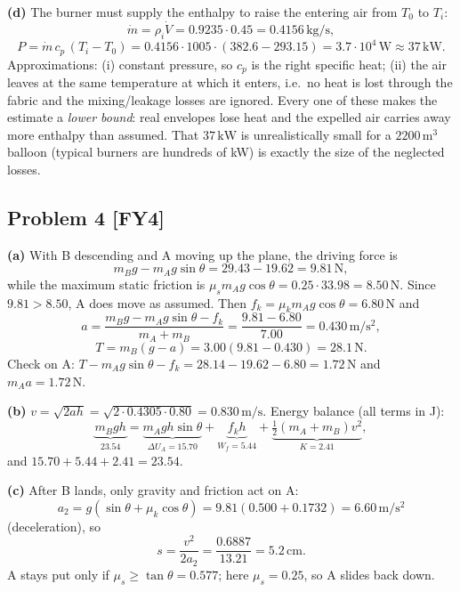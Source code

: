 \documentclass[11pt,a4paper]{article}
\newcommand{\problem}[2]{\subsection*{Problem #1 \; \textnormal{\small[#2]}}}
\newcommand{\unit}[1]{\,\mathrm{#1}}
\begin{document}
\textbf{(d)} The burner must supply the enthalpy to raise the entering air
from $T_0$ to $T_i$:
\[
  \dot m=\rho_i\dot V=0.9235\cdot0.45=0.4156\unit{kg/s},
\]
\[
  P=\dot m\,c_p\,(T_i-T_0)=0.4156\cdot1005\cdot(382.6-293.15)
  =\boxed{3.7\cdot10^{4}\unit{W}\approx37\unit{kW}}.
\]
Approximations: (i) constant pressure, so $c_p$ is the right specific
heat; (ii) the air leaves at the same temperature at which it enters, i.e.\
no heat is lost through the fabric and the mixing/leakage losses are
ignored. Every one of these makes the estimate a \emph{lower bound}: real
envelopes lose heat and the expelled air carries away more enthalpy than
assumed. That $37\unit{kW}$ is unrealistically small for a
$2200\unit{m^3}$ balloon (typical burners are hundreds of kW) is exactly
the size of the neglected losses.

\problem{4}{FY4}
\textbf{(a)} With B descending and A moving up the plane, the driving force
is
\[
  m_Bg-m_Ag\sin\theta = 29.43-19.62=9.81\unit{N},
\]
while the maximum static friction is
$\mu_s m_Ag\cos\theta=0.25\cdot33.98=8.50\unit{N}$. Since $9.81>8.50$, A
does move as assumed. Then $f_k=\mu_k m_Ag\cos\theta=6.80\unit{N}$ and
\[
  a=\frac{m_Bg-m_Ag\sin\theta-f_k}{m_A+m_B}
  =\frac{9.81-6.80}{7.00}=\boxed{0.430\unit{m/s^2}},
\]
\[
  T=m_B(g-a)=3.00(9.81-0.430)=\boxed{28.1\unit{N}}.
\]
Check on A: $T-m_Ag\sin\theta-f_k=28.14-19.62-6.80=1.72\unit{N}$ and
$m_Aa=1.72\unit{N}$. \checkmark

\textbf{(b)} $v=\sqrt{2ah}=\sqrt{2\cdot0.4305\cdot0.80}
=\boxed{0.830\unit{m/s}}$.
Energy balance (all terms in J):
\[
  \underbrace{m_Bgh}_{23.54}
  =\underbrace{m_Agh\sin\theta}_{\Delta U_A=15.70}
  +\underbrace{f_kh}_{W_f=5.44}
  +\underbrace{\tfrac12(m_A+m_B)v^2}_{K=2.41},
\]
and $15.70+5.44+2.41=23.54$. \checkmark

\textbf{(c)} After B lands, only gravity and friction act on A:
\[
  a_2=g(\sin\theta+\mu_k\cos\theta)=9.81(0.500+0.1732)
  =6.60\unit{m/s^2}
\]
(deceleration), so
\[
  s=\frac{v^2}{2a_2}=\frac{0.6887}{13.21}=\boxed{5.2\unit{cm}}.
\]
A stays put only if $\mu_s\ge\tan\theta=0.577$; here $\mu_s=0.25$, so A
slides back down.
\end{document}
